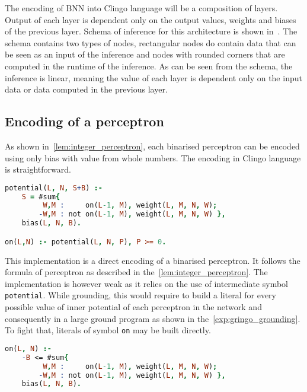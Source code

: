 The encoding of BNN into Clingo language will be a composition of layers.
Output of each layer is dependent only on the output values, weights and biases
of the previous layer. Schema of inference for this architecture is shown
in~. The schema contains two types of nodes,
rectangular nodes do contain data that can be seen as an input of the inference
and nodes with rounded corners that are computed in the runtime of the inference.
As can be seen from the schema, the inference is linear, meaning the value of each
layer is dependent only on the input data or data computed in the previous layer.

\subsection{Encoding of a perceptron}

As shown in~\cref{lem:integer_perceptron}, each binarised perceptron can be encoded
using only bias with value from whole numbers. The encoding in Clingo language is
straightforward.

\begin{code}
\begin{lstlisting}[language=Prolog, numbers=none]
potential(L, N, S+B) :-
    S = #sum{
         W,M :     on(L-1, M), weight(L, M, N, W);
        -W,M : not on(L-1, M), weight(L, M, N, W) },
    bias(L, N, B).

on(L,N) :- potential(L, N, P), P >= 0.
\end{lstlisting}%
    \nobreak{}\label{enc:perc_potential}
\end{code}

This implementation is a direct encoding of a binarised perceptron.
It follows the formula of perceptron as described in the~\cref{lem:integer_perceptron}.
The implementation is however weak as it relies on the use of intermediate
symbol \texttt{potential}. While grounding, this would require to build a literal
for every possible value of inner potential of each perceptron in the network
and consequently in a large ground program as shown in the~\cref{exp:gringo_grounding}.
To fight that, literals of symbol \texttt{on} may be built directly.\label{sec:perc_potential_removal}

\begin{code}
\begin{lstlisting}[language=Prolog, numbers=none]
on(L, N) :-
    -B <= #sum{
         W,M :     on(L-1, M), weight(L, M, N, W);
        -W,M : not on(L-1, M), weight(L, M, N, W) },
    bias(L, N, B).
\end{lstlisting}
    \nobreak{}\label{enc:perc_direct}
\end{code}

